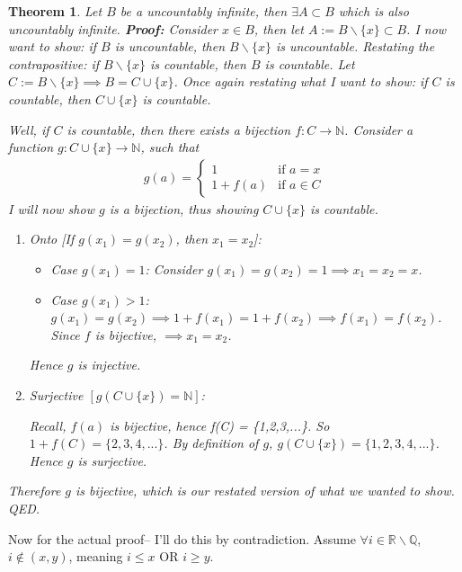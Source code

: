 \documentclass[12pt,fleqn]{article}
\numberwithin{equation}{section} %
\newtheorem{theorem}{Theorem}
\begin{document}
\begin{theorem}
	\label{thm:p1 exists subset uncountable}
	Let $B$ be a uncountably infinite, then $\exists A \subset B$ which is also uncountably infinite.
	\textbf{Proof:} Consider $x \in B$, then let $A:= B\backslash  \{x\} \subset B$. I now want to show: if $B$ is uncountable, then $B\backslash \{x\}$ is uncountable. Restating the contrapositive: if $B\backslash\{x\}$ is countable, then $B$ is countable. Let $C:= B\backslash \{x\} \implies B  = C \cup \{x\}$. Once again restating what I want to show: if $C$ is countable, then $C \cup \{x\}$ is countable.
	
	Well, if $C$ is countable, then there exists a bijection $f: C \to \mathbb N$. Consider a function $g: C \cup \{x\} \to \mathbb N$, such that
	\begin{align}
		g(a) = \begin{cases}
			1 & \text{if } a=x\\
			1 + f(a) & \text{if } a \in C
		\end{cases}
	\end{align}
	I will now show $g$ is a bijection, thus showing $C \cup \{x\}$ is countable.
	\begin{enumerate}
		\item Onto [If $g(x_1) = g(x_2)$, then $x_1 = x_2$]: 
		\begin{itemize}
			\item Case $g(x_1) = 1$: Consider $g(x_1) = g(x_2) = 1 \implies x_1 = x_2 = x$. 
			\item Case $g(x_1) > 1$: $g(x_1) = g(x_2) \implies 1 + f(x_1) = 1 + f(x_2) \implies f(x_1) = f(x_2)$. Since $f$ is bijective, $\implies x_1 = x_2$.
		\end{itemize}
		Hence $g$ is injective.
		\item Surjective $[g(C \cup \{x\}) = \mathbb N]$:

		Recall, $f(a)$ is bijective, hence f(C) = \{1,2,3,...\}. So $1 + f(C) = \{2,3,4,...\}$. By definition of $g$, $g(C \cup \{x\}) = \{1,2,3,4,... \}$. Hence $g$ is surjective.	 
	\end{enumerate}
	Therefore $g$ is bijective, which is our restated version of what we wanted to show. QED.
\end{theorem}

Now for the actual proof-- I'll do this by contradiction. Assume $\forall i \in \mathbb R \backslash \mathbb Q$, $ i \notin (x,y)$, meaning $i \leq x$ OR $i \geq y$. 
\end{document}
